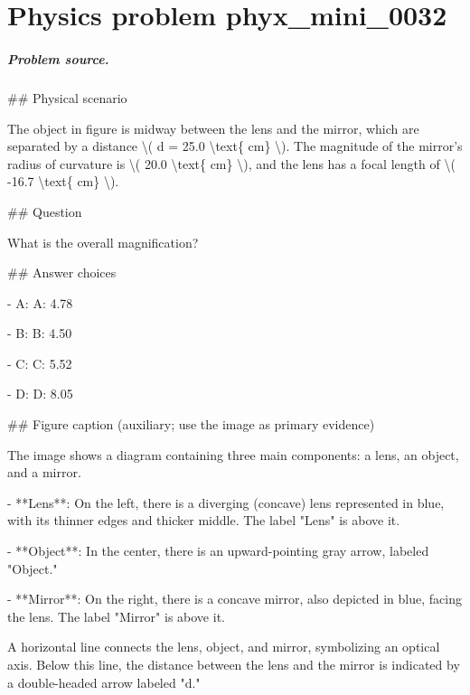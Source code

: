 
\chapter{Physics problem phyx\_mini\_0032}
\label{ch:PhyXMiniProblems_problem_phyx_mini_0032}

\paragraph{Problem source.}
\#\# Physical scenario

The object in figure is midway between the lens and the mirror, which are separated by a distance \textbackslash{}( d = 25.0 \textbackslash{}text\{ cm\} \textbackslash{}). The magnitude of the mirror's radius of curvature is \textbackslash{}( 20.0 \textbackslash{}text\{ cm\} \textbackslash{}), and the lens has a focal length of \textbackslash{}( -16.7 \textbackslash{}text\{ cm\} \textbackslash{}).

\#\# Question

What is the overall magnification?

\#\# Answer choices

- A: A: 4.78

- B: B: 4.50

- C: C: 5.52

- D: D: 8.05

\#\# Figure caption (auxiliary; use the image as primary evidence)

The image shows a diagram containing three main components: a lens, an object, and a mirror. 

- **Lens**: On the left, there is a diverging (concave) lens represented in blue, with its thinner edges and thicker middle. The label "Lens" is above it.

- **Object**: In the center, there is an upward-pointing gray arrow, labeled "Object."

- **Mirror**: On the right, there is a concave mirror, also depicted in blue, facing the lens. The label "Mirror" is above it.

A horizontal line connects the lens, object, and mirror, symbolizing an optical axis. Below this line, the distance between the lens and the mirror is indicated by a double-headed arrow labeled "d."

